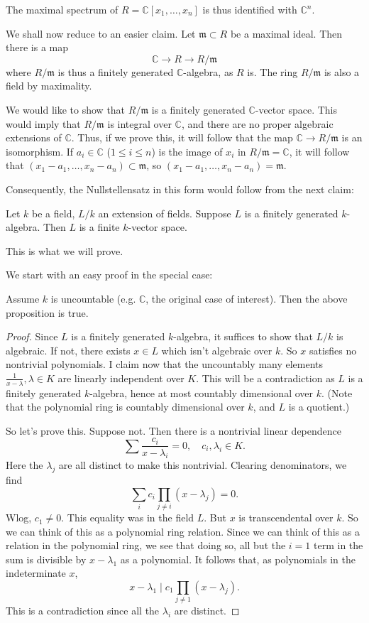 The maximal spectrum of $R=\mathbb{C}[x_1, \dots, x_n]$ is thus identified with
$\mathbb{C}^n$.

We shall now reduce  to an easier claim.
Let
$\mathfrak{m}\subset R$ be a maximal ideal. Then there is a map
\[ \mathbb{C} \to R \to R/\mathfrak{m}  \]
where $R/\mathfrak{m}$ is thus a finitely generated $\mathbb{C}$-algebra, as
$R$ is.  The ring $R/\mathfrak{m}$ is also a field by maximality.

We would like to show that $R/\mathfrak{m}$ is a finitely generated
$\mathbb{C}$-vector
space. This would imply that $R/\mathfrak{m}$ is integral over $\mathbb{C}$,
and there are no proper algebraic extensions of $\mathbb{C}$. Thus, if we
prove this, it will follow that the map $\mathbb{C} \to R/\mathfrak{m}$ is an
isomorphism. If $a_i \in \mathbb{C}$ ($1 \leq i \leq n$) is the image of
$x_i $ in $R/\mathfrak{m} =
\mathbb{C}$, it will follow that $(x_1 - a_1, \dots, x_n - a_n) \subset
\mathfrak{m}$, so $(x_1 - a_1, \dots, x_n - a_n)=
\mathfrak{m}$.


Consequently, the Nullstellensatz in this form would follow from the next
claim:

\begin{proposition}
Let $k$ be a field, $L/k$ an extension of fields. Suppose $L$ is a finitely
generated $k$-algebra. Then $L$ is a finite $k$-vector space.
\end{proposition}
This is what we will prove.

We start with an easy proof in the special case:
\begin{lemma}
Assume $k$ is uncountable (e.g. $\mathbb{C}$, the original case of interest).
Then the above proposition is true.
\end{lemma}
\begin{proof}
Since $L$ is a finitely generated $k$-algebra, it suffices to show that $L/k$
is algebraic.
If not, there exists $x \in L$ which isn't algebraic over $k$. So $x$ satisfies
no nontrivial polynomials.
I claim now that the uncountably many elements $\frac{1}{x-\lambda}, \lambda
\in K$ are linearly
independent over $K$. This will be a contradiction as $L$ is a finitely
generated $k$-algebra, hence at most countably dimensional over $k$. (Note that
the polynomial ring is countably dimensional over $k$, and $L$ is a quotient.)

So let's prove this. Suppose not. Then there is a nontrivial linear dependence
\[ \sum \frac{c_i}{x - \lambda_i}  = 0, \quad c_i, \lambda_i \in K. \]
Here the $\lambda_j$ are all distinct to make this nontrivial. Clearing
denominators, we find
\[ \sum_i c_i \prod_{j \neq i } (x- \lambda_j) = 0. \]
Wlog, $c_1 \neq 0$.
This equality was in the field $L$. But $x$ is transcendental over $k$. So we
can think of this as a polynomial ring relation.
Since we can think of this as a relation in the polynomial ring, we see that
doing so, all but the $i =1$ term in the sum is divisible by $x - \lambda_1$
as a polynomial.
It follows that, as polynomials in the indeterminate $x$,
\[ x - \lambda_1 \mid c_1 \prod_{j \neq 1} (x - \lambda_j).  \]
This is a contradiction since all the $\lambda_i$ are distinct.
\end{proof}

